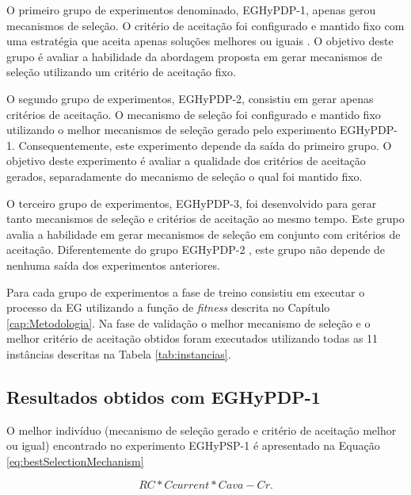 O primeiro grupo de experimentos denominado, EGHyPDP-1, apenas gerou mecanismos de seleção. O critério de aceitação foi configurado e mantido fixo com uma estratégia que aceita apenas soluções melhores ou iguais \cite{burke2013hyper}. O objetivo deste grupo é avaliar a habilidade da abordagem proposta em gerar mecanismos de seleção utilizando um critério de aceitação fixo.

	O segundo grupo de experimentos, EGHyPDP-2, consistiu em gerar apenas critérios de aceitação. O mecanismo de seleção foi configurado e mantido fixo utilizando o melhor mecanismos de seleção gerado pelo experimento EGHyPDP-1. Consequentemente, este experimento depende da saída do primeiro grupo. O objetivo deste experimento é avaliar a qualidade dos critérios de aceitação gerados, separadamente do mecanismo de seleção o qual foi mantido fixo.
	
	O terceiro grupo de experimentos,  EGHyPDP-3, foi desenvolvido para gerar tanto mecanismos de seleção e critérios de aceitação ao mesmo tempo. Este grupo avalia a habilidade em gerar mecanismos de seleção em conjunto com critérios de aceitação. Diferentemente do grupo EGHyPDP-2  , este grupo não depende de nenhuma saída dos experimentos anteriores.


	Para cada grupo de experimentos a fase de treino consistiu em executar o processo da EG utilizando a função de \textit{fitness} descrita no Capítulo \ref{cap:Metodologia}. Na fase de validação o melhor mecanismo de seleção e o melhor critério de aceitação obtidos foram  executados utilizando todas as 11 instâncias descritas na Tabela \ref{tab:instancias}. 
	

	
	\subsection{Resultados obtidos com EGHyPDP-1}
	\label{subsection:gehypdp1results}
	
	O melhor indivíduo (mecanismo de seleção gerado e critério de aceitação melhor ou igual) encontrado no experimento EGHyPSP-1 é apresentado na Equação \ref{eq:bestSelectionMechanism}
	
	\begin{equation}
	\label{eq:bestSelectionMechanism}
	RC * Ccurrent * Cava -Cr.
	\end{equation}
	

